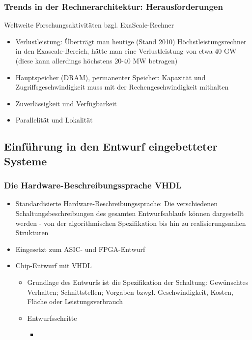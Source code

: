 \subsubsection{Trends in der Rechnerarchitektur: Herausforderungen}
Weltweite Forschungsaktivitäten bzgl. ExaScale-Rechner
\begin{itemize}
	\item Verlustleistung: Überträgt man heutige (Stand 2010) Höchstleistungsrechner in den Exascale-Bereich, hätte man eine Verlustleistung von etwa 40 GW (diese kann allerdings höchstens 20-40 MW betragen)
	\item Hauptspeicher (DRAM), permanenter Speicher: Kapazität und Zugriffsgeschwindigkeit muss mit der Rechengeschwindigkeit mithalten
	\item Zuverlässigkeit und Verfügbarkeit
	\item Parallelität und Lokalität
\end{itemize}


\subsection{Einführung in den Entwurf eingebetteter Systeme}

\subsubsection{Die Hardware-Beschreibungssprache VHDL}
\begin{itemize}
	\item Standardisierte Hardware-Beschreibungssprache: Die verschiedenen Schaltungsbeschreibungen des gesamten Entwurfsablaufs können dargestellt werden - von der algorithmischen Spezifikation bis hin zu realisierungsnahen Strukturen
	\item Eingesetzt zum ASIC- und FPGA-Entwurf
	\item Chip-Entwurf mit VHDL
	\begin{itemize}
		\item Grundlage des Entwurfs ist die Spezifikation der Schaltung: Gewünschtes Verhalten; Schnittstellen; Vorgaben bzwgl. Geschwindigkeit, Kosten, Fläche oder Leistungsverbrauch
		\item Entwurfsschritte
		\begin{itemize}
			\item 
		\end{itemize}
	\end{itemize}
\end{itemize}



